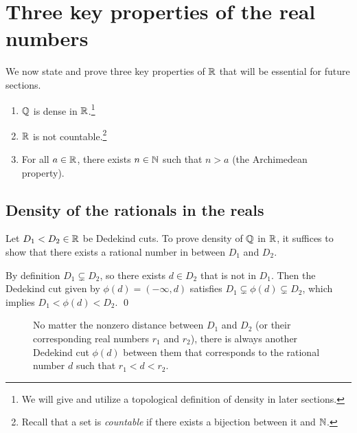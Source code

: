 \documentclass[master.tex]{subfiles}
\begin{document}
\section{Three key properties of the real numbers}
    We now state and prove three key properties of $\mathbb{R}$ that will be essential for future sections.
    \begin{enumerate}
        \item $\mathbb{Q}$ is dense in $\mathbb{R}$.\footnote{
            We will give and utilize a topological definition of density in later sections.
        }
        \item $\mathbb{R}$ is not countable.\footnote{
            Recall that a set is \emph{countable} if there exists a bijection between it and $\mathbb{N}$.
        }
        \item For all $a \in \mathbb{R}$, there exists $n \in \mathbb{N}$ such that $n > a$ (the Archimedean property).
    \end{enumerate}    

    \subsection{Density of the rationals in the reals}
    Let $D_1 < D_2 \in \mathbb{R}$ be Dedekind cuts.
    To prove density of $\mathbb{Q}$ in $\mathbb{R}$, it suffices to show that there exists a rational number in between $D_1$ and $D_2$.

    By definition $D_1 \subsetneq D_2$, so there exists $d \in D_2$ that is not in $D_1$.
    Then the Dedekind cut given by $\phi(d) = (-\infty, d)$ satisfies $D_1 \subsetneq \phi(d) \subsetneq D_2
    $, which implies $D_1 < \phi(d) < D_2$. \qed

    \begin{figure}[ht]
        \centering
        \caption{No matter the nonzero distance between $D_1$ and $D_2$ (or their corresponding real numbers $r_1$ and $r_2$), there is always another Dedekind cut $\phi(d)$ between them that corresponds to the rational number $d$ such that $r_1 < d < r_2$.}
    \end{figure}
\end{document}
